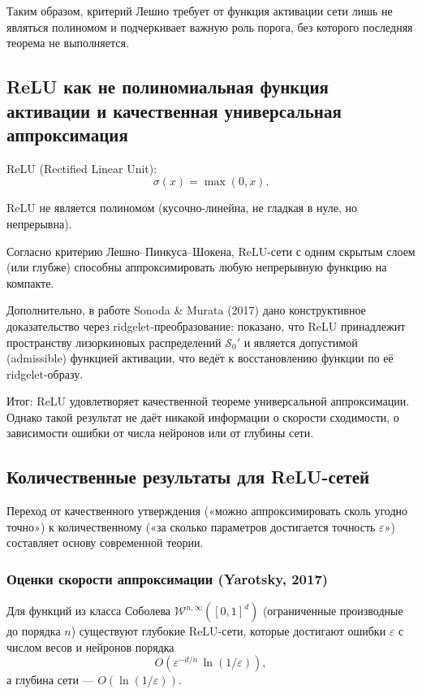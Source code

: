 \documentclass[12pt]{article}
\begin{document}
	Таким образом, критерий Лешно требует от функция активации сети лишь не являться полиномом и подчеркивает важную роль порога, без которого последняя теорема не выполняется.
	
	\subsection{ReLU как не полиномиальная функция активации и качественная универсальная аппроксимация}
	
	ReLU (Rectified Linear Unit): 
	\[
	\sigma(x)=\max(0,x).
	\]
	
	ReLU не является полиномом (кусочно-линейна, не гладкая в нуле, но непрерывна).
	
	Согласно критерию Лешно–Пинкуса–Шокена, ReLU-сети с одним скрытым слоем (или глубже) способны аппроксимировать любую непрерывную функцию на компакте.
	
	Дополнительно, в работе Sonoda \& Murata (2017) дано конструктивное доказательство через ridgelet-преобразование: показано, что ReLU принадлежит пространству лизоркиновых распределений 
	\(\mathcal{S}_0'\) и является допустимой (admissible) функцией активации, что ведёт к восстановлению функции по её ridgelet-образу.
	
	Итог: ReLU удовлетворяет качественной теореме универсальной аппроксимации. Однако такой результат не даёт никакой информации о скорости сходимости, о зависимости ошибки от числа нейронов или от глубины сети.
	
	\subsection{Количественные результаты для ReLU-сетей}
	
	Переход от качественного утверждения («можно аппроксимировать сколь угодно точно») к количественному («за сколько параметров достигается точность \(\varepsilon\)») составляет основу современной теории.
	
	\subsubsection*{Оценки скорости аппроксимации (Yarotsky, 2017)}
	
	Для функций из класса Соболева \(\mathcal{W}^{n,\infty}([0,1]^d)\) (ограниченные производные до порядка \(n\)) существуют глубокие ReLU-сети, которые достигают ошибки \(\varepsilon\) с числом весов и нейронов порядка
	\[
	O\!\left(\varepsilon^{-d/n}\,\ln(1/\varepsilon)\right),
	\]
	а глубина сети — \(O(\ln(1/\varepsilon))\).
	
\end{document}
